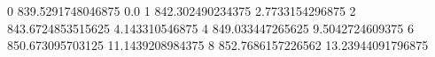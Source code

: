 0 839.5291748046875 0.0
1 842.302490234375 2.7733154296875
2 843.6724853515625 4.143310546875
4 849.033447265625 9.5042724609375
6 850.673095703125 11.1439208984375
8 852.7686157226562 13.23944091796875
